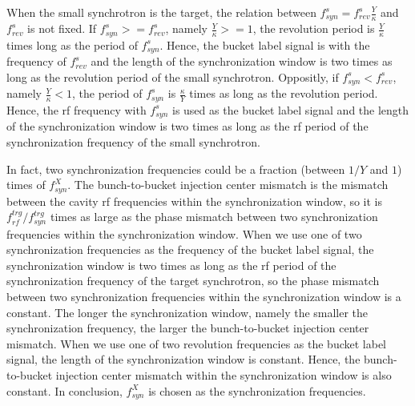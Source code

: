 When the small synchrotron is the target, the relation between $f_{\mathit{syn}}^{s}=f_{\mathit{rev}}^{s}\frac{Y}{\kappa}$ and $f_{\mathit{rev}}^{s}$ is not fixed. If $f_{\mathit{syn}}^{s}>=f_{\mathit{rev}}^{s}$, namely $\frac{Y}{\kappa}>=1$, the revolution period is $\frac{Y}{\kappa}$ times long as the period of $f_{\mathit{syn}}^{s}$. Hence, the bucket label signal is with the frequency of $f_{\mathit{rev}}^{s}$ and the length of the synchronization window is two times as long as the revolution period of the small synchrotron.
Oppositly,  if $f_{\mathit{syn}}^{s}<f_{\mathit{rev}}^{s}$, namely $\frac{Y}{\kappa}<1$, the period of $f_{\mathit{syn}}^{s}$ is $\frac{\kappa}{Y}$ times as long as the revolution period. Hence, the rf frequency with $f_{\mathit{syn}}^{s}$ is used as the bucket label signal and the length of the synchronization window is two times as long as the rf period of the synchronization frequency of the small synchrotron. 

In fact, two synchronization frequencies could be a fraction (between $1/Y$ and $1$) times of $f_{\mathit{syn}}^{X}$. The bunch-to-bucket injection center mismatch is the mismatch between the cavity rf frequencies within the synchronization window, so it is $f_{\mathit{rf}}^{trg}/f_{\mathit{syn}}^{trg}$ times as large as the phase mismatch between two synchronization frequencies within the synchronization window. When we use one of two synchronization frequencies as the frequency of the bucket label signal, the synchronization window is two times as long as the rf period of the synchronization frequency of the target synchrotron, so the phase mismatch between two synchronization frequencies within the synchronization window is a constant. The longer the synchronization window, namely the smaller the synchronization frequency, the larger the bunch-to-bucket injection center mismatch. When we use one of two revolution frequencies as the bucket label signal, the length of the synchronization window is constant. Hence, the bunch-to-bucket injection center mismatch within the synchronization window is also constant. In conclusion, $f_{\mathit{syn}}^{X}$ is chosen as the synchronization frequencies.



